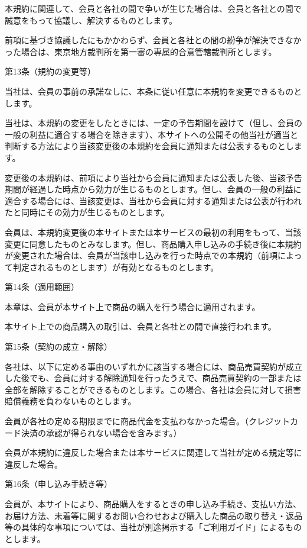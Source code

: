     本規約に関連して、会員と各社の間で争いが生じた場合は、会員と各社との間で誠意をもって協議し、解決するものとします。

    前項に基づき協議したにもかかわらず、会員と各社との間の紛争が解決できなかった場合は、東京地方裁判所を第一審の専属的合意管轄裁判所とします。

第13条（規約の変更等）

    当社は、会員の事前の承諾なしに、本条に従い任意に本規約を変更できるものとします。

    当社は、本規約の変更をしたときには、一定の予告期間を設けて（但し、会員の一般の利益に適合する場合を除きます）、本サイトへの公開その他当社が適当と判断する方法により当該変更後の本規約を会員に通知または公表するものとします。

    変更後の本規約は、前項により当社から会員に通知または公表した後、当該予告期間が経過した時点から効力が生じるものとします。但し、会員の一般の利益に適合する場合には、当該変更は、当社から会員に対する通知または公表が行われたと同時にその効力が生じるものとします。

    会員は、本規約変更後の本サイトまたは本サービスの最初の利用をもって、当該変更に同意したものとみなします。但し、商品購入申し込みの手続き後に本規約が変更された場合は、会員が当該申し込みを行った時点での本規約（前項によって判定されるものとします）が有効となるものとします。

第14条（適用範囲）

    本章は、会員が本サイト上で商品の購入を行う場合に適用されます。

    本サイト上での商品購入の取引は、会員と各社との間で直接行われます。

第15条（契約の成立・解除）

    各社は、以下に定める事由のいずれかに該当する場合には、商品売買契約が成立した後でも、会員に対する解除通知を行ったうえで、商品売買契約の一部または全部を解除することができるものとします。この場合、各社は会員に対して損害賠償義務を負わないものとします。

        会員が各社の定める期限までに商品代金を支払わなかった場合。（クレジットカード決済の承認が得られない場合を含みます。）

        会員が本規約に違反した場合または本サービスに関連して当社が定める規定等に違反した場合。

第16条（申し込み手続き等）

    会員が、本サイトにより、商品購入をするときの申し込み手続き、支払い方法、お届け方法、未着等に関するお問い合わせおよび購入した商品の取り替え・返品等の具体的な事項については、当社が別途掲示する「ご利用ガイド」によるものとします。

